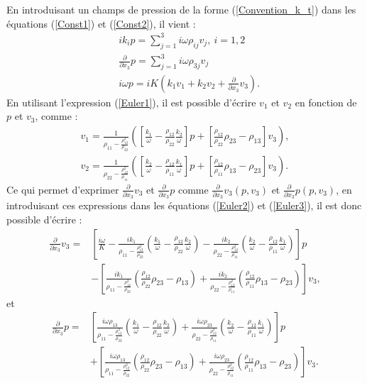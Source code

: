 \documentclass[12pt]{report}
\begin{document}
    En introduisant un champs de pression de la forme (\ref{Convention_k_t}) dans les équations (\ref{Const1}) et (\ref{Const2}), il vient :
    \begin{align}
	&ik_ip=\sum_{j=1}^{3} i \omega \rho_{ij} v_j,\ i=1,2\label{Euler1}\\
	&\frac{\partial}{\partial x_3}p=\sum_{j=1}^{3} i \omega \rho_{3j} v_j\label{Euler2}\\
    &i\omega p= iK(k_1v_1+k_2v_2+\frac{\partial}{\partial x_3}v_3).\label{Euler3}
    \end{align}
	En utilisant l'expression (\ref{Euler1}), il est possible d'écrire $v_1$ et $v_2$ en fonction de $p$ et $v_3$, comme :
    \begin{align}
	v_1=\frac{1}{\rho_{11}-\frac{\rho_{12}^2}{\rho_{22}}}([\frac{k_1}{\omega}-\frac{\rho_{12}}{\rho_{22}}\frac{k_2}{\omega}]p+[\frac{\rho_{12}}{\rho_{22}}\rho_{23}-\rho_{13}]v_3), \\
	v_2=\frac{1}{\rho_{22}-\frac{\rho_{12}^2}{\rho_{11}}}([\frac{k_2}{\omega}-\frac{\rho_{12}}{\rho_{11}}\frac{k_1}{\omega}]p+[\frac{\rho_{12}}{\rho_{11}}\rho_{13}-\rho_{23}]v_3).
    \end{align}
 	Ce qui permet d'exprimer $\frac{\partial}{\partial x_3}v_3$ et $\frac{\partial}{\partial x_3}p$ comme $\frac{\partial}{\partial x_3}v_3(p,v_3)$ et $\frac{\partial}{\partial x_3}p(p,v_3)$, en introduisant ces expressions dans les équations (\ref{Euler2}) et (\ref{Euler3}), il est donc possible d'écrire :
    \begin{align*}
    \frac{\partial}{\partial x_3}v_3=&[\frac{i\omega}{K}-\frac{ik_1}{\rho_{11}-\frac{\rho_{12}^2}{\rho_{22}}}(\frac{k_1}{\omega}-\frac{\rho_{12}}{\rho_{22}}\frac{k_2}{\omega})-\frac{ik_2}{\rho_{22}-\frac{\rho_{12}^2}{\rho_{11}}}(\frac{k_2}{\omega}-\frac{\rho_{12}}{\rho_{11}}\frac{k_1}{\omega})]p\\
    &-[\frac{ik_1}{\rho_{11}-\frac{\rho_{12}^2}{\rho_{22}}}(\frac{\rho_{12}}{\rho_{22}}\rho_{23}-\rho_{13})+\frac{ik_2}{\rho_{22}-\frac{\rho_{12}^2}{\rho_{11}}}(\frac{\rho_{12}}{\rho_{11}}\rho_{13}-\rho_{23})]v_3,
    \end{align*}
    et 
    \begin{align*}
    \frac{\partial}{\partial x_3}p=&[\frac{i\omega \rho_{13}}{\rho_{11}-\frac{\rho_{12}^2}{\rho_{22}}}(\frac{k_1}{\omega}-\frac{\rho_{12}}{\rho_{22}}\frac{k_2}{\omega})+\frac{i\omega \rho_{23}}{\rho_{22}-\frac{\rho_{12}^2}{\rho_{11}}}(\frac{k_2}{\omega}-\frac{\rho_{12}}{\rho_{11}}\frac{k_1}{\omega})]p\\
    &+[\frac{i\omega \rho_{13}}{\rho_{11}-\frac{\rho_{12}^2}{\rho_{22}}}(\frac{\rho_{12}}{\rho_{22}}\rho_{23}-\rho_{13})+\frac{i\omega \rho_{23}}{\rho_{22}-\frac{\rho_{12}^2}{\rho_{11}}}(\frac{\rho_{12}}{\rho_{11}}\rho_{13}-\rho_{23})]v_3.
    \end{align*}
    
\end{document}
